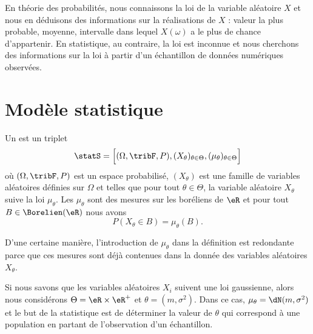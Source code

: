 En théorie des probabilités, nous connaissons la loi de la variable aléatoire \( X\) et nous en déduisons des informations sur la réalisations de \( X\) : valeur la plus probable, moyenne, intervalle dans lequel \( X(\omega)\) a le plus de chance d'appartenir. En statistique, au contraire, la loi est inconnue et nous cherchons des informations sur la loi à partir d'un échantillon de données numériques observées.

\section{Modèle statistique}

Un  est un triplet
\begin{equation}
	\statS=\Big[ (\Omega,\tribF,P),(X_{\theta})_{\theta\in\Theta},(\mu_{\theta})_{\theta\in\Theta} \Big]
\end{equation}
où \( (\Omega,\tribF,P)\) est un espace probabilisé, \( (X_{\theta})\) est une famille de variables aléatoires définies sur \( \Omega\) et telles que pour tout \( \theta\in\Theta\), la variable aléatoire \( X_{\theta}\) suive la loi \( \mu_{\theta}\). Les \( \mu_{\theta}\) sont des mesures sur les boréliens de \( \eR\) et pour tout \( B\in\Borelien(\eR)\) nous avons
\begin{equation}
	P(X_{\theta}\in B)=\mu_{\theta}(B).
\end{equation}
\begin{remark}
	D'une certaine manière, l'introduction de \( \mu_{\theta}\) dans la définition est redondante parce que ces mesures sont déjà contenues dans la donnée des variables aléatoires \( X_{\theta}\).
\end{remark}

\begin{example}
	Si nous savons que les variables aléatoires \( X_i\) suivent une loi gaussienne, alors nous considérons \( \Theta=\eR\times\eR^+\) et \( \theta=(m,\sigma^2)\). Dans ce cas, \( \mu_{\theta}=\dN(m,\sigma^2)\) et le but de la statistique est de déterminer la valeur de \( \theta\) qui correspond à une population en partant de l'observation d'un échantillon.
\end{example}

